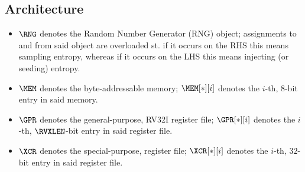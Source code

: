 
\subsection{Architecture}

\begin{itemize}

\item $\RNG$
      denotes the Random Number Generator (RNG) object;
      assignments to and from said object are overloaded st. if
      it occurs on the RHS this means sampling               entropy,
      whereas if
      it occurs on the LHS this means injecting (or seeding) entropy.
\item $\MEM$
      denotes the byte-addressable memory;
      $\MEM[*][i]$ 
      denotes the $i$-th,
            $8$-bit 
      entry in said memory.
\item $\GPR$ 
      denotes the 
      general-purpose, RV32I register file;
      $\GPR[*][i]$ 
      denotes the $i$-th,
      $\RVXLEN$-bit
      entry in said register file.
\item $\XCR$ 
      denotes the 
      special-purpose, \XCID register file;
      $\XCR[*][i]$ 
      denotes the $i$-th,
           $32$-bit 
      entry in said register file.


\end{itemize}

